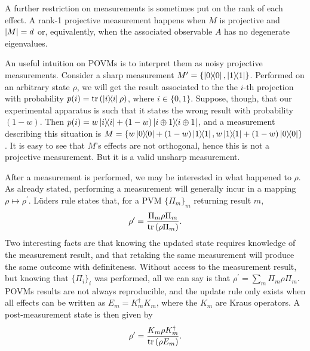 		A further restriction on measurements is sometimes put on the rank of each effect. A rank-1 projective measurement happens when $M$ is projective and $\abs{M} = d$ or, equivalently, when the associated observable $A$ has no degenerate eigenvalues.
		
		An useful intuition on POVMs is to interpret them as noisy projective measurements. Consider a sharp measurement $M^\prime = \{ \ketbra{0}{0}, \ketbra{1}{1} \}$. Performed on an arbitrary state $\rho$, we will get the result associated to the the $i$-th projection with probability $p(i) = \text{tr}\left( \ketbra{i}{i} \rho \right)$, where $i \in \{0, 1\}$. Suppose, though, that our experimental apparatus is such that it states the wrong result with probability $(1 - w)$. Then $p(i) = w \ketbra{i}{i} + (1 - w) \ketbra{i \oplus1}{i \oplus 1}$, and a measurement describing this situation is $M = \{ w \ketbra{0}{0} + (1 - w) \ketbra{1}{1}, w \ketbra{1}{1} + (1 - w) \ketbra{0}{0} \}$. It is easy to see that $M$'s effects are not orthogonal, hence this is not a projective measurement. But it is a valid unsharp measurement.
		
		After a measurement is performed, we may be interested in what happened to $\rho$. As already stated, performing a measurement will generally incur in a mapping $\rho \mapsto \rho^\prime$. Lüders rule states that, for a PVM $\{ \Pi_m \}_m$ returning result $m$,
		\begin{equation}
			\rho^\prime = \frac{\Pi_m \rho \Pi_m}{\text{tr}\left( \rho \Pi_m \right)} .
			\label{eq:luders-rule}
		\end{equation}
		Two interesting facts are that knowing the updated state requires knowledge of the measurement result, and that retaking the same measurement will produce the same outcome with definiteness. Without access to the measurement result, but knowing that $\{ \Pi_i \}_i$ was performed, all we can say is that $\rho^\prime = \sum_m \Pi_m \rho \Pi_m$. POVMs results are not always reproducible, and the update rule only exists when all effects can be written as $E_m = K_m^\dagger K_m$, where the $K_m$ are Kraus operators. A post-measurement state is then given by
		$$
			\rho^\prime = \frac{K_m \rho K_m^\dagger}{\text{tr}\left( \rho E_m \right)} .
		$$
		
